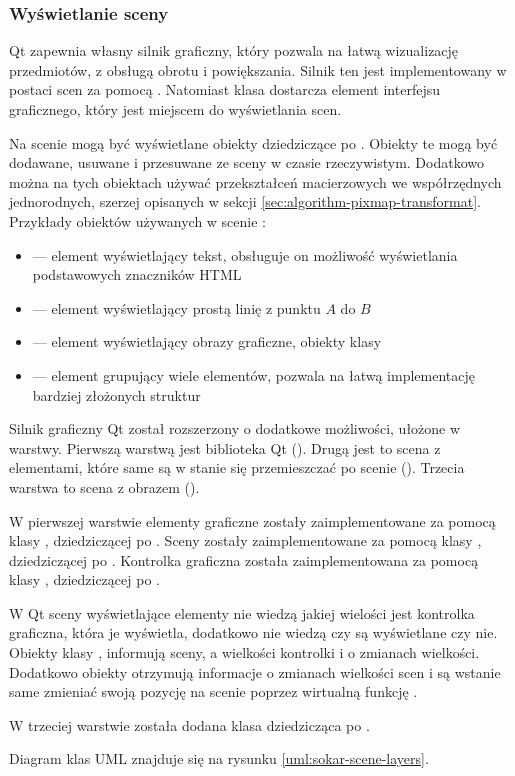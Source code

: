 \subsubsection{Wyświetlanie sceny}
\par
Qt zapewnia własny silnik graficzny, który pozwala na łatwą wizualizację przedmiotów, z obsługą obrotu i powiększania.
Silnik ten jest implementowany w postaci scen za pomocą .
Natomiast klasa  dostarcza element interfejsu graficznego, który jest miejscem do wyświetlania scen.
\par
Na scenie mogą być wyświetlane obiekty dziedziczące po .
Obiekty te mogą być dodawane, usuwane i przesuwane ze sceny w czasie rzeczywistym.
Dodatkowo można na tych obiektach używać przekształceń macierzowych we współrzędnych jednorodnych, szerzej opisanych w sekcji \ref{sec:algorithm-pixmap-transformat}.
Przykłady obiektów używanych w scenie :
\begin{itemize}
    \item {} --- element wyświetlający tekst, obsługuje on możliwość wyświetlania podstawowych znaczników HTML
    \item {} --- element wyświetlający prostą linię z punktu $A$ do $B$
    \item {} --- element wyświetlający obrazy graficzne, obiekty klasy 
    \item {} --- element grupujący wiele elementów, pozwala na łatwą implementację bardziej złożonych struktur
\end{itemize}
\par
Silnik graficzny Qt został rozszerzony o dodatkowe możliwości, ułożone w warstwy.
Pierwszą warstwą jest biblioteka Qt ().
Drugą jest to scena z elementami, które same są w stanie się przemieszczać po scenie ().
Trzecia warstwa to scena z obrazem \DICOM ().
\par
W pierwszej warstwie elementy graficzne zostały zaimplementowane za pomocą klasy , dziedziczącej po .
Sceny zostały zaimplementowane za pomocą klasy , dziedziczącej po .
Kontrolka graficzna została zaimplementowana za pomocą klasy , dziedziczącej po . 
\par
W Qt sceny wyświetlające elementy nie wiedzą jakiej wielości jest kontrolka graficzna, która je wyświetla, dodatkowo nie wiedzą czy są wyświetlane czy nie.
Obiekty klasy , informują sceny, a wielkości kontrolki i o zmianach wielkości.
Dodatkowo obiekty  otrzymują informacje o zmianach wielkości scen i są wstanie same zmieniać swoją pozycję na scenie poprzez wirtualną funkcję .
\par
W trzeciej warstwie została dodana klasa  dziedzicząca po .
\par
Diagram klas UML znajduje się na rysunku \ref{uml:sokar-scene-layers}.


